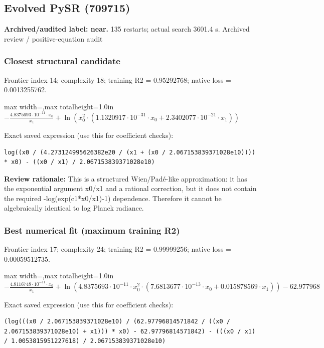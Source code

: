 \documentclass[10pt,letterpaper,landscape]{article}
\begin{document}
\begin{minipage}[t]{0.485\textwidth}
\subsection*{Evolved PySR (709715)}
\textbf{Archived/audited label: near.} 135 restarts; actual search 3601.4 s.
{\small Archived review / positive-equation audit}
\subsubsection*{Closest structural candidate}
Frontier index 14; complexity 18; training R2 = 0.95292768; native loss = 0.0013255762.
\begin{center}\begin{adjustbox}{max width=\linewidth,max totalheight=1.0in}$\displaystyle - \frac{4.8375693 \cdot 10^{-11} \cdot x_{0}}{x_{1}} + \ln{\left(x_{0}^{2} \cdot \left(1.1320917 \cdot 10^{-31} \cdot x_{0} + 2.3402077 \cdot 10^{-21} \cdot x_{1}\right) \right)}$\end{adjustbox}\end{center}
{\scriptsize Exact saved expression (use this for coefficient checks):}
\begin{lstlisting}
log((x0 / (4.273124995626382e20 / (x1 + (x0 / 2.067153839371028e10)))) * x0) - ((x0 / x1) / 2.067153839371028e10)
\end{lstlisting}
{\small\textbf{Review rationale:} This is a structured Wien/Padé-like approximation: it has the exponential argument x0/x1 and a rational correction, but it does not contain the required -log(exp(c1*x0/x1)-1) dependence. Therefore it cannot be algebraically identical to log Planck radiance.}
\subsubsection*{Best numerical fit (maximum training R2)}
Frontier index 17; complexity 24; training R2 = 0.99999256; native loss = 0.00059512735.
\begin{center}\begin{adjustbox}{max width=\linewidth,max totalheight=1.0in}$\displaystyle - \frac{4.8116748 \cdot 10^{-11} \cdot x_{0}}{x_{1}} + \ln{\left(4.8375693 \cdot 10^{-11} \cdot x_{0}^{2} \cdot \left(7.6813677 \cdot 10^{-13} \cdot x_{0} + 0.015878569 \cdot x_{1}\right) \right)} - 62.977968$\end{adjustbox}\end{center}
{\scriptsize Exact saved expression (use this for coefficient checks):}
\begin{lstlisting}
(log(((x0 / 2.067153839371028e10) / (62.97796814571842 / ((x0 / 2.067153839371028e10) + x1))) * x0) - 62.97796814571842) - (((x0 / x1) / 1.0053815951227618) / 2.067153839371028e10)
\end{lstlisting}
\end{minipage}
\clearpage{}\label{rydberg-10000}
\end{document}
